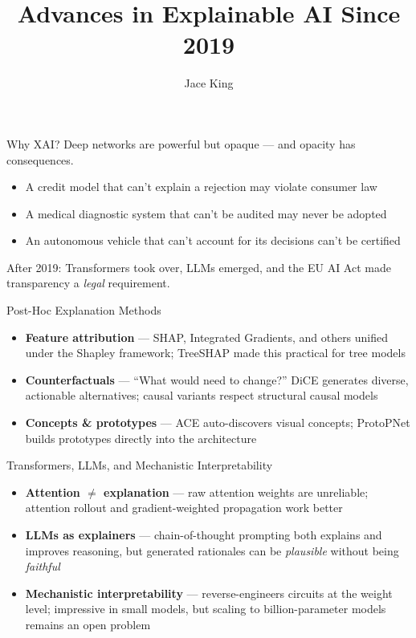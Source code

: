 \documentclass[aspectratio=169]{beamer}
\title{Advances in Explainable AI Since 2019}
\author{Jace King}
\institute{University of Memphis}
\date{}
\begin{document}
\maketitle

\begin{frame}{Why XAI?}
  Deep networks are powerful but opaque --- and opacity has consequences.
  \vspace{1em}
  \begin{itemize}
    \item A credit model that can't explain a rejection may violate consumer law
    \item A medical diagnostic system that can't be audited may never be adopted
    \item An autonomous vehicle that can't account for its decisions can't be certified
  \end{itemize}
  \vspace{1em}
  After 2019: Transformers took over, LLMs emerged, and the EU AI Act made transparency a \emph{legal} requirement.
\end{frame}

\begin{frame}{Post-Hoc Explanation Methods}
  \begin{itemize}
    \item \textbf{Feature attribution} --- SHAP, Integrated Gradients, and others unified under the Shapley framework; TreeSHAP made this practical for tree models
    \item \textbf{Counterfactuals} --- ``What would need to change?'' DiCE generates diverse, actionable alternatives; causal variants respect structural causal models
    \item \textbf{Concepts \& prototypes} --- ACE auto-discovers visual concepts; ProtoPNet builds prototypes directly into the architecture
  \end{itemize}
\end{frame}

\begin{frame}{Transformers, LLMs, and Mechanistic Interpretability}
  \begin{itemize}
    \item \textbf{Attention $\neq$ explanation} --- raw attention weights are unreliable; attention rollout and gradient-weighted propagation work better
    \item \textbf{LLMs as explainers} --- chain-of-thought prompting both explains and improves reasoning, but generated rationales can be \emph{plausible} without being \emph{faithful}
    \item \textbf{Mechanistic interpretability} --- reverse-engineers circuits at the weight level; impressive in small models, but scaling to billion-parameter models remains an open problem
  \end{itemize}
\end{frame}
\end{document}
